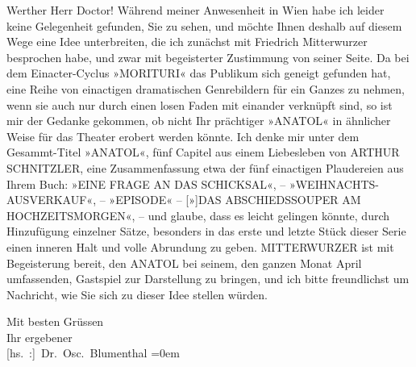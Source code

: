 \pstart\center{}Werther Herr Doctor!\pend\vspace{0.5em}
\pstart
           Während meiner Anwesenheit in Wien habe ich leider
               keine Gelegenheit gefunden, Sie zu sehen, und möchte Ihnen deshalb auf diesem Wege
               eine Idee unterbreiten, die ich zunächst mit Friedrich Mitterwurzer besprochen habe, und zwar mit begeisterter Zustimmung
               von seiner Seite. Da bei dem Einacter-Cyclus »MORITURI« das Publikum sich geneigt gefunden hat, eine Reihe von einactigen dramatischen
               Genrebildern für ein Ganzes zu nehmen, wenn sie auch nur durch einen losen Faden mit
               einander verknüpft sind, so ist mir der Gedanke gekommen, ob nicht Ihr prächtiger
                  »ANATOL« in ähnlicher Weise für das Theater erobert werden könnte. Ich denke mir unter
               dem Gesammt-Titel »ANATOL«, fünf Capitel aus einem Liebesleben von ARTHUR SCHNITZLER, eine Zusammenfassung etwa der fünf {\pb}einactigen Plaudereien aus Ihrem Buch:
                  »EINE FRAGE AN DAS SCHICKSAL«, – »WEIHNACHTS-AUSVERKAUF«, – »EPISODE« – {[}»{]}DAS ABSCHIEDSSOUPER AM HOCHZEITSMORGEN«, – und glaube, dass es leicht gelingen könnte, durch Hinzufügung einzelner
               Sätze, besonders in das erste und letzte Stück dieser Serie einen inneren Halt und
               volle Abrundung zu geben. MITTERWURZER ist mit Begeisterung bereit, den ANATOL bei seinem, den ganzen Monat April umfassenden, Gastspiel zur
               Darstellung zu bringen, und ich bitte freundlichst um Nachricht, wie Sie sich zu
               dieser Idee stellen würden.\pend
           
\pstart
           Mit besten Grüssen{\\[\baselineskip]} Ihr ergebener{\\[\baselineskip]}\spacefill\mbox{{[}hs. :{]} Dr. Osc. Blumenthal}\pend
           \leftskip=0em{}\endnumbering{}  
      